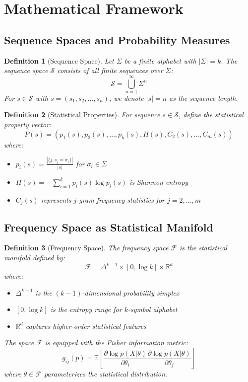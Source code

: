 \documentclass[11pt]{article}
\newtheorem{definition}{Definition}
\newcommand{\seqspace}{\mathcal{S}}
\newcommand{\freqspace}{\mathcal{F}}
\newcommand{\alphabet}{\Sigma}
\newcommand{\entropy}[1]{H(#1)}
\newcommand{\prob}[1]{P(#1)}
\newcommand{\expect}[1]{\mathbb{E}[#1]}
\newcommand{\real}{\mathbb{R}}
\begin{document}
\section{Mathematical Framework}

\subsection{Sequence Spaces and Probability Measures}

\begin{definition}[Sequence Space]
Let $\alphabet$ be a finite alphabet with $|\alphabet| = k$. The sequence space $\seqspace$ consists of all finite sequences over $\alphabet$:
\[\seqspace = \bigcup_{n=1}^{\infty} \alphabet^n\]
For $s \in \seqspace$ with $s = (s_1, s_2, \ldots, s_n)$, we denote $|s| = n$ as the sequence length.
\end{definition}

\begin{definition}[Statistical Properties]
For sequence $s \in \seqspace$, define the statistical property vector:
\[\prob{s} = (p_1(s), p_2(s), \ldots, p_k(s), \entropy{s}, C_2(s), \ldots, C_m(s))\]
where:
\begin{itemize}
    \item $p_i(s) = \frac{|\{j : s_j = \sigma_i\}|}{|s|}$ for $\sigma_i \in \alphabet$
    \item $\entropy{s} = -\sum_{i=1}^k p_i(s) \log p_i(s)$ is Shannon entropy
    \item $C_j(s)$ represents $j$-gram frequency statistics for $j = 2, \ldots, m$
\end{itemize}
\end{definition}

\subsection{Frequency Space as Statistical Manifold}

\begin{definition}[Frequency Space]
The frequency space $\freqspace$ is the statistical manifold defined by:
\[\freqspace = \Delta^{k-1} \times [0, \log k] \times \real^{d}\]
where:
\begin{itemize}
    \item $\Delta^{k-1}$ is the $(k-1)$-dimensional probability simplex
    \item $[0, \log k]$ is the entropy range for $k$-symbol alphabet  
    \item $\real^d$ captures higher-order statistical features
\end{itemize}

The space $\freqspace$ is equipped with the Fisher information metric:
\[g_{ij}(p) = \expect{\frac{\partial \log p(X|\theta)}{\partial \theta_i} \frac{\partial \log p(X|\theta)}{\partial \theta_j}}\]
where $\theta \in \freqspace$ parameterizes the statistical distribution.
\end{definition}
\end{document}
